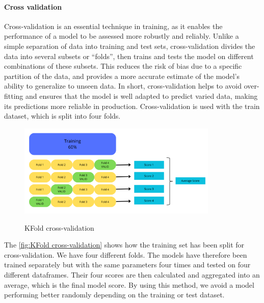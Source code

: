 \documentclass[12pt]{article}
\begin{document}
\paragraph{Cross validation}
Cross-validation is an essential technique in training, as it enables the performance of a model to be assessed more robustly and reliably. Unlike a simple separation of data into training and test sets, cross-validation divides the data into several subsets or “folds”, then trains and tests the model on different combinations of these subsets. This reduces the risk of bias due to a specific partition of the data, and provides a more accurate estimate of the model's ability to generalize to unseen data. In short, cross-validation helps to avoid over-fitting and ensures that the model is well adapted to predict varied data, making its predictions more reliable in production. Cross-validation is used with the train dataset, which is split into four folds.
\begin{figure}[h]
    \centering
    \includegraphics[width=0.85\textwidth]{KFold data.png}\\
    \caption{KFold cross-validation}
    \label{fig:KFold cross-validation}
\end{figure}
\FloatBarrier
The \autoref{fig:KFold cross-validation} shows how the training set has been split for cross-validation. We have four different folds. The models have therefore been trained separately but with the same parameters four times and tested on four different dataframes. Their four scores are then calculated and aggregated into an average, which is the final model score. By using this method, we avoid a model performing better randomly depending on the training or test dataset. 
\end{document}
